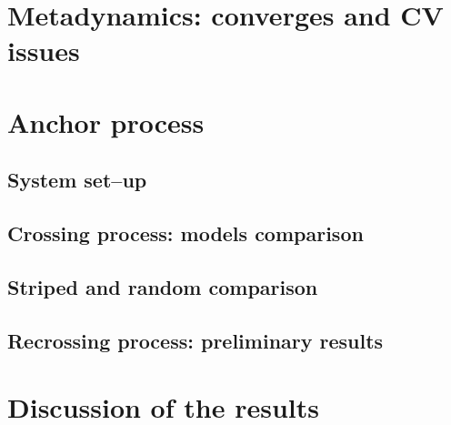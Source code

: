 \section{Metadynamics: converges and CV issues}

\section{Anchor process}

\subsection{System set--up}

\subsection{Crossing process: models comparison}

\subsection{Striped and random comparison}

	
\subsection{Recrossing process: preliminary results}


\section{Discussion of the results}


